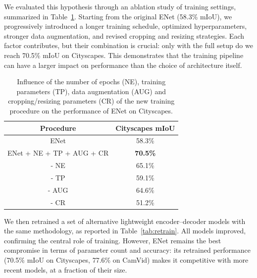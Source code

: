 \documentclass[11pt]{report}
\begin{document}
We evaluated this hypothesis through an ablation study of training settings, summarized in Table~\ref{tab:ablation}. Starting from the original ENet (58.3\% mIoU), we progressively introduced a longer training schedule, optimized hyperparameters, stronger data augmentation, and revised cropping and resizing strategies. Each factor contributes, but their combination is crucial: only with the full setup do we reach 70.5\% mIoU on Cityscapes. This demonstrates that the training pipeline can have a larger impact on performance than the choice of architecture itself.

\begin{table}[h]
  \centering
  \caption{Influence of the number of epochs (NE), training parameters (TP), data augmentation (AUG) and cropping/resizing parameters (CR) of the new training procedure on the performance of ENet on Cityscapes.}
  \begin{tabular}{c|c}
    \textbf{Procedure}        & \textbf{Cityscapes mIoU} \\\hline
    ENet                      & 58.3\%                   \\\hline
    ENet + NE + TP + AUG + CR & \textbf{70.5\%}          \\\hline
    - NE                      & 65.1\%                   \\ \hline
    - TP                      & 59.1\%                   \\\hline
    - AUG                     & 64.6\%                   \\\hline
    - CR                      & 51.2\%                   \\
  \end{tabular}
  \label{tab:ablation}
\end{table}

We then retrained a set of alternative lightweight encoder–decoder models with the same methodology, as reported in Table~\ref{tab:retrain}. All models improved, confirming the central role of training. However, ENet remains the best compromise in terms of parameter count and accuracy: its retrained performance (70.5\% mIoU on Cityscapes, 77.6\% on CamVid) makes it competitive with more recent models, at a fraction of their size.
\end{document}
